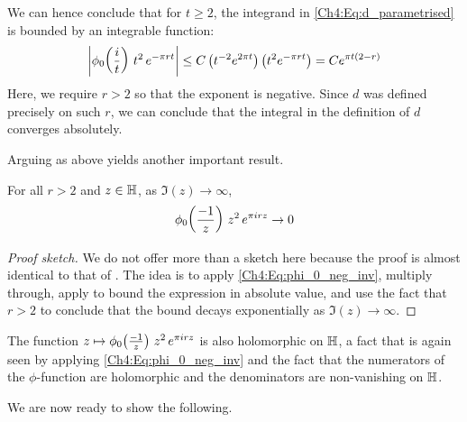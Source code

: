 We can hence conclude that for $t \geq 2$, the integrand in \eqref{Ch4:Eq:d_parametrised} is bounded by an integrable function:
\begin{align*}
    \left\lvert \phi_0\!\left( \frac{i}{t} \right) \, t^2 \, e^{-\pi r t} \right\rvert 
    \leq C \left( t^{-2} e^{2\pi t} \right) \left( t^2 e^{-\pi r t} \right)
    = C e^{\pi t \left( 2 - r \right)}
\end{align*}
Here, we require $r > 2$ so that the exponent is negative. Since $d$ was defined precisely on such $r$, we can conclude that the integral in the definition of $d$ converges absolutely.

Arguing as above yields another important result.
\begin{boxlemma}
    For all $r > 2$ and $z \in \mathbb{H}$, as $\Im(z) \to \infty$,
    \begin{align*}
        \phi_{0}\!\left( \frac{-1}{z} \right) \, z^2 \, e^{\pi i r z} \to 0
    \end{align*}
\end{boxlemma}
\begin{proof}[Proof sketch]
    We do not offer more than a sketch here because the proof is almost identical to that of . The idea is to apply \eqref{Ch4:Eq:phi_0_neg_inv}, multiply through, apply  to bound the expression in absolute value, and use the fact that $r > 2$ to conclude that the bound decays exponentially as $\Im(z) \to \infty$.
\end{proof}

The function $z \mapsto \phi_{0}\!\left( \frac{-1}{z} \right) \, z^2 \, e^{\pi i r z}$ is also holomorphic on $\mathbb{H}$, a fact that is again seen by applying \eqref{Ch4:Eq:phi_0_neg_inv} and the fact that the numerators of the $\phi$-function are holomorphic and the denominators are non-vanishing on $\mathbb{H}$.

We are now ready to show the following.

